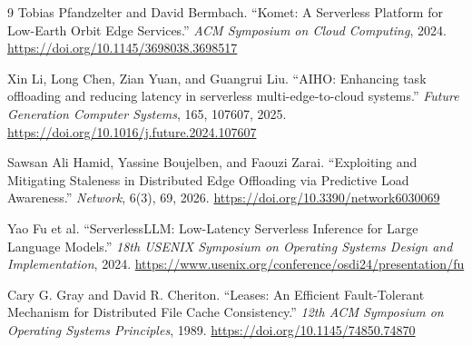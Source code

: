 \documentclass[11pt,a4paper]{article}
\begin{document}
\begin{thebibliography}{9}
 Tobias Pfandzelter and David Bermbach. ``Komet: A Serverless Platform for Low-Earth Orbit Edge Services.'' \emph{ACM Symposium on Cloud Computing}, 2024. \url{https://doi.org/10.1145/3698038.3698517}

 Xin Li, Long Chen, Zian Yuan, and Guangrui Liu. ``AIHO: Enhancing task offloading and reducing latency in serverless multi-edge-to-cloud systems.'' \emph{Future Generation Computer Systems}, 165, 107607, 2025. \url{https://doi.org/10.1016/j.future.2024.107607}

 Sawsan Ali Hamid, Yassine Boujelben, and Faouzi Zarai. ``Exploiting and Mitigating Staleness in Distributed Edge Offloading via Predictive Load Awareness.'' \emph{Network}, 6(3), 69, 2026. \url{https://doi.org/10.3390/network6030069}

 Yao Fu et al. ``ServerlessLLM: Low-Latency Serverless Inference for Large Language Models.'' \emph{18th USENIX Symposium on Operating Systems Design and Implementation}, 2024. \url{https://www.usenix.org/conference/osdi24/presentation/fu}

 Cary G. Gray and David R. Cheriton. ``Leases: An Efficient Fault-Tolerant Mechanism for Distributed File Cache Consistency.'' \emph{12th ACM Symposium on Operating Systems Principles}, 1989. \url{https://doi.org/10.1145/74850.74870}
\end{thebibliography}
\end{document}

